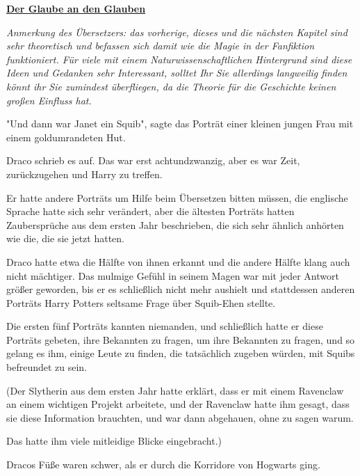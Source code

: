 

\hypertarget{der-glaube-an-den-glauben}{%

\textbf{\uline{Der Glaube an den Glauben}}

\emph{Anmerkung des Übersetzers: das vorherige, dieses und die nächsten Kapitel sind sehr theoretisch und befassen sich damit wie die Magie in der Fanfiktion funktioniert. Für viele mit einem Naturwissenschaftlichen Hintergrund sind diese Ideen und Gedanken sehr Interessant, solltet Ihr Sie allerdings langweilig finden könnt ihr Sie zumindest überfliegen, da die Theorie für die Geschichte keinen großen Einfluss hat.}

"Und dann war Janet ein Squib", sagte das Porträt einer kleinen jungen Frau mit einem goldumrandeten Hut.

Draco schrieb es auf. Das war erst achtundzwanzig, aber es war Zeit, zurückzugehen und Harry zu treffen.

Er hatte andere Porträts um Hilfe beim Übersetzen bitten müssen, die englische Sprache hatte sich sehr verändert, aber die ältesten Porträts hatten Zaubersprüche aus dem ersten Jahr beschrieben, die sich sehr ähnlich anhörten wie die, die sie jetzt hatten.

Draco hatte etwa die Hälfte von ihnen erkannt und die andere Hälfte klang auch nicht mächtiger. Das mulmige Gefühl in seinem Magen war mit jeder Antwort größer geworden, bis er es schließlich nicht mehr aushielt und stattdessen anderen Porträts Harry Potters seltsame Frage über Squib-Ehen stellte.

Die ersten fünf Porträts kannten niemanden, und schließlich hatte er diese Porträts gebeten, ihre Bekannten zu fragen, um ihre Bekannten zu fragen, und so gelang es ihm, einige Leute zu finden, die tatsächlich zugeben würden, mit Squibs befreundet zu sein.

(Der Slytherin aus dem ersten Jahr hatte erklärt, dass er mit einem Ravenclaw an einem wichtigen Projekt arbeitete, und der Ravenclaw hatte ihm gesagt, dass sie diese Information brauchten, und war dann abgehauen, ohne zu sagen warum.

Das hatte ihm viele mitleidige Blicke eingebracht.)

Dracos Füße waren schwer, als er durch die Korridore von Hogwarts ging.

}
